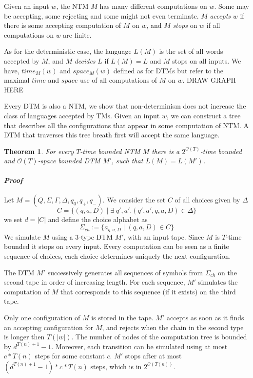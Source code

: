 \documentclass{report}
\newtheorem{theorem}[definition]{Theorem}
\begin{document}
Given an input $w$, the NTM $M$ has many different computations on $w$. Some may be accepting, some rejecting and some might not even terminate. $M$ \textit{accepts} $w$ if there is some accepting computation of $M$ on $w$, and $M$ \textit{stops} on $w$ if all computations on $w$ are finite.

As for the deterministic case, the language $L(M)$ is the set of all words accepted by $M$, and $M$ \textit{decides} $L$ if $L(M) = L$ and $M$ stops on all inputs. We have, $time_M(w)$ and $space_M(w)$ defined as for DTMs but refer to the maximal $time$ and $space$ use of all computations of $M$ on $w$. DRAW GRAPH HERE

Every DTM is also a NTM, we show that non-determinism does not increase the class of languages accepted by TMs. Given an input $w$, we can construct a tree that describes all the configurations that appear in some computation of NTM. A DTM that traverses this tree breath first will accept the same language.

\begin{theorem}For every $T$-time bounded NTM $M$ there is a $2^{\mathcal{O}(T)}$-time bounded and $\mathcal{O}(T)$-space bounded DTM $M'$, such that $L(M) = L(M')$.
\end{theorem}

\paragraph{\textit{Proof}} Let $M = (Q,\Sigma,\Gamma,\Delta,q_0,q_+,q_-)$. We consider the set $C$ of all choices given by $\Delta$ \[C = \{(q,a,D)\;|\;\exists\;q',a'.(q',a',q,a,D) \in \Delta\}\]
we set $d = |C|$ and define the choice alphabet as
\[\Sigma_{ch} := \{a_{q,a,D}\;|\;(q,a,D) \in C\}\]
We simulate $M$ using a 3-type DTM $M'$, with an input tape. Since $M$ is $T$-time bounded it stops on every input. Every computation can be seen as a finite sequence of choices, each choice determines uniquely the next configuration.

The DTM $M'$ successively generates all sequences of symbols from $\Sigma_{ch}$ on the second tape in order of increasing length. For each sequence, $M'$ simulates the computation of $M$ that corresponds to this sequence (if it exists) on the third tape.

Only one configuration of $M$ is stored in the tape. $M'$ accepts as soon as it finds an accepting configuration for $M$, and rejects when the chain in the second type is longer then $T(|w|)$. The number of nodes of the computation tree is bounded by $d^{T(n)+1}-1$. Moreover, each transition can be simulated using at most $c*T(n)$ steps for some constant $c$. $M'$ stops after at most $(d^{T(n)+1}-1)*c*T(n)$ steps, which is in $2^{\mathcal{O}(T(n))}$.
\end{document}
